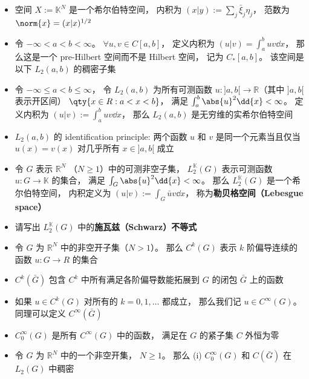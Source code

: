\begin{itemize}
\item 空间 $X := \mathbb K^N$ 是一个希尔伯特空间， 内积为 $(x|y) := \sum_j \bar \xi_j \eta_j$， 范数为 $\norm{x} = (x|x)^{1/2}$

\item 令 $-\infty < a < b < \infty$。 $\forall u, v\in C[a, b]$， 定义内积为 $(u|v)=\int_a^b uv\dd{x}$， 那么这是一个 pre-Hilbert 空间而不是 Hilbert 空间， 记为 $C_*[a, b]$。 该空间是以下 $L_2(a, b)$ 的稠密子集

\item 令 $-\infty \leqslant a < b \leqslant \infty$， 令 $L_2(a, b)$ 为所有可测函数 $u :]a, b[ \to \mathbb R$（其中 $]a, b[$ 表示开区间） $\qty{x \in R : a < x < b}$， 满足 $\int_a^b \abs{u}^2 \dd{x} < \infty$。 定义内积为 $(u|v) := \int_a^b uv \dd{x}$， 那么 $L_2(a, b)$ 是无穷维的实希尔伯特空间

\item $L_2(a, b)$ 的 identification principle: 两个函数 $u$ 和 $v$ 是同一个元素当且仅当 $u(x) = v(x)$ 对几乎所有 $x \in ]a, b[$ 成立

\item 令 $G$ 表示 $\mathbb R^N$ （$N \geqslant 1$）中的可测非空子集， $L_2^{\mathbb K}(G)$ 表示可测函数 $u: G \to \mathbb K$ 的集合， 满足 $\int_G \abs{u}^2 \dd{x} < \infty$。 那么 $L_2^{\mathbb K}(G)$ 是一个希尔伯特空间， 内积定义为 $(u|v) := \int_G \bar u v \dd{x}$， 称为\textbf{勒贝格空间（Lebesgue space）}

\item 请写出 $L_2^{\mathbb K}(G)$ 中的\textbf{施瓦兹（Schwarz）不等式}

\item 令 $G$ 为 $\mathbb R^N$ 中的非空开子集（$N > 1$）。 那么 $C^k(G)$ 表示 $k$ 阶偏导连续的函数 $u: G \to R$ 的集合

\item $C^k(\bar G)$ 包含 $C^k$ 中所有满足各阶偏导数能拓展到 $G$ 的闭包 $\bar G$ 上的函数

\item 如果 $u \in C^k(G)$ 对所有的 $k = 0, 1, \dots$ 都成立， 那么我们记 $u \in C^\infty(G)$。 同理可以定义 $C^\infty(\bar G)$

\item $C_0^\infty (G)$ 是所有 $C^\infty(G)$ 中的函数， 满足在 $G$ 的紧子集 $C$ 外恒为零

\item 令 $G$ 为 $\mathbb R^N$ 中的一个非空开集， $N \geqslant 1$。 那么 (i) $C_0^\infty(G)$ 和 $C(\bar G)$ 在 $L_2(G)$ 中稠密


\end{itemize}
